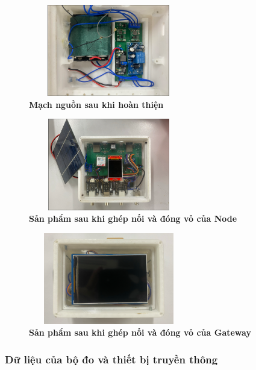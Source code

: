 \documentclass{article} %
\begin{document}
	\begin{figure}[!ht]
		\centering
		\includegraphics[width=7cm,height=4cm]{Images/MachNHT.png}
		\caption[   Mạch nguồn sau khi hoàn thiện  ]{\bfseries \fontsize{12pt}{0pt}\selectfont  Mạch nguồn sau khi hoàn thiện }
		\label{MachNHT}
	\end{figure}
	\begin{figure}[!ht]
		\centering
		\includegraphics[width=7cm,height=4cm]{Images/DvNode.png}
		\caption[  Sản phẩm sau khi ghép nối và đóng vỏ của Node ]{\bfseries \fontsize{12pt}{0pt}\selectfont Sản phẩm sau khi ghép nối và đóng vỏ của Node}
		\label{DvNode}
	\end{figure}
	\begin{figure}[!ht]
		\centering
		\includegraphics[width=7cm,height=4cm]{Images/DvGate.png}
		\caption[  Sản phẩm sau khi ghép nối và đóng vỏ của Gateway ]{\bfseries \fontsize{12pt}{0pt}\selectfont Sản phẩm sau khi ghép nối và đóng vỏ của Gateway}
		\label{DvGate}
	\end{figure}
	
	\newpage
	\subsubsection{Dữ liệu của bộ đo và thiết bị truyền thông}
	
\end{document}
